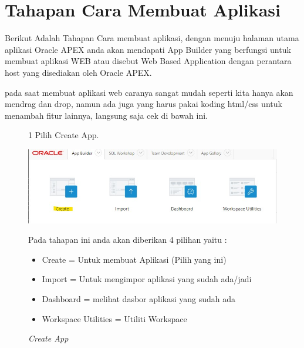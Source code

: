 \section{Tahapan Cara Membuat Aplikasi}
Berikut Adalah Tahapan Cara membuat aplikasi, dengan menuju halaman utama aplikasi Oracle APEX anda akan mendapati App Builder yang berfungsi untuk membuat aplikasi WEB atau disebut Web Based Application dengan perantara host yang disediakan oleh Oracle APEX.

\par pada saat membuat aplikasi web caranya sangat mudah seperti kita hanya akan mendrag dan drop, namun ada juga yang harus pakai koding html/css untuk menambah fitur lainnya, langsung saja cek di bawah ini.
   
\begin{itemize}
        \begin{figure}[!htbp]
        \item[1]Pilih Create App.
        \begin{center}
        \includegraphics[scale=0.4]{figures/create_app.jpg}
        \caption{\textit{Create App}}
        \end{center}
        \par Pada tahapan ini anda akan diberikan 4 pilihan yaitu :
        \begin{itemize}
            \item Create = Untuk membuat Aplikasi (Pilih yang ini)
            \item Import = Untuk mengimpor aplikasi yang sudah ada/jadi
            \item Dashboard = melihat dasbor aplikasi yang sudah ada
            \item Workspace Utilities = Utiliti Workspace
        \end{itemize}
        \end{figure}
        

\end{itemize}
